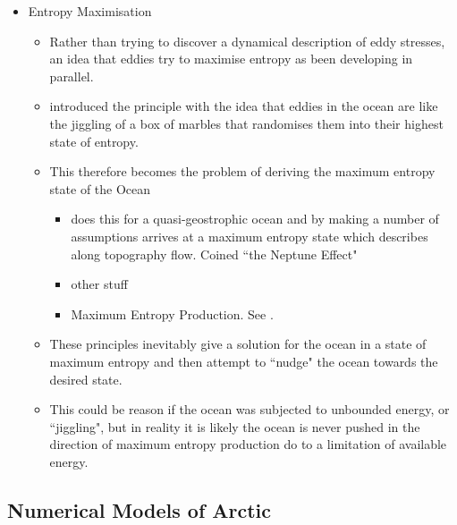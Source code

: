\documentclass[10pt,a4paper]{article}
\begin{document}
\begin{itemize}
                	\item Entropy  Maximisation
                	\begin{itemize}      
                		\item Rather than trying to discover a dynamical description of eddy stresses, an idea that eddies try to maximise entropy as been developing
                		in parallel.
                		\item \cite{holloway1987systematic} introduced the principle with
                		the idea that eddies in the ocean are like the jiggling of a box of 
                		marbles that randomises them into their highest state of entropy.
                		\item This therefore becomes the problem of deriving the maximum
                		entropy state of the Ocean
                		\begin{itemize}      
                			\item \cite{holloway1992representing} does this for a
                			 quasi-geostrophic ocean and by making a number of assumptions  
                			 arrives at a maximum entropy state which describes along 
                			 topography flow. Coined ``the Neptune Effect"
                			\item other stuff
                			\item Maximum Entropy Production. See \cite{polyakov2001eddy}.
                		\end{itemize}
                		\item These principles inevitably give a solution for the ocean in 
                		a state of maximum entropy and then attempt to ``nudge" the ocean
                		towards the desired state. 
                		\item This could be reason if the ocean was subjected to unbounded 
                		energy, or ``jiggling", but in reality it is likely the ocean is never
                		pushed in the direction of maximum entropy production do to
                		a limitation of available energy.
                	\end{itemize}  
                	
                \end{itemize}


\subsection{Numerical Models of Arctic}
	
\end{document}
